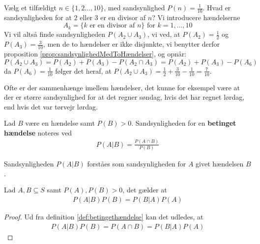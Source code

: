  
\begin{exmp} %
Vælg et tilfældigt $n \in \{1, 2 \ldots, 10\}$, med sandsynlighed $P(n)=\frac{1}{10}$. Hvad er sandsynligheden for at $2$ eller $3$ er en divisor af $n$?
Vi introducere hændelserne
\begin{equation*}
    A_k = \{k \text{ er en divisor af } n\} \text{ for } k = 1, \ldots, 10  
\end{equation*}
Vi vil altså finde sandsynligheden $P(A_2 \cup A_3)$, vi ved, at $P(A_2) = \frac{1}{2}$ og $P(A_3) = \frac{3}{10}$, men de to hændelser er ikke disjunkte, vi benytter derfor proposition \ref{prop:sandsynlighedMedToHændelser}, og opnår:
\begin{equation*}
    P(A_2 \cup A_3) = P(A_2) + P(A_3) - P(A_2 \cap A_3) = P(A_2) + P(A_3) - P(A_6)
\end{equation*}
da $P(A_6) = \frac{1}{10}$ følger det heraf, at $P(A_2 \cup A_3) = \frac{1}{2} + \frac{3}{10} - \frac{1}{10} = \frac{7}{10}$.
\end{exmp}


Ofte er der sammenhænge imellem hændelser, det kunne for eksempel være at der er større sandsynlighed for at det regner søndag, hvis det har regnet lørdag, end hvis det var tørvejr lørdag.
\begin{defn}\label{def:betingethændelse} %
Lad $B$ være en hændelse samt $P(B)>0$. Sandsynligheden for en \textbf{betinget hændelse} noteres ved
\begin{align*}
    P(A|B)=\frac{P(A\cap B)}{P(B)}
\end{align*}
\end{defn}
Sandsynligheden $P(A|B)$ forståes som sandsynligheden for $A$ givet hændelsen $B$.

 
\begin{thm} %
Lad $A, B \subseteq S$ samt $P(A), P(B) > 0$, det gælder at
\begin{align*}
    P(A|B)P(B)=P(B|A)P(A)
\end{align*}
\end{thm}
\begin{proof}
Ud fra definition \ref{def:betingethændelse} kan det udledes, at
\begin{align*}
    P(A|B)P(B)=P(A\cap B)=P(B|A)P(A)
\end{align*}
\end{proof}

